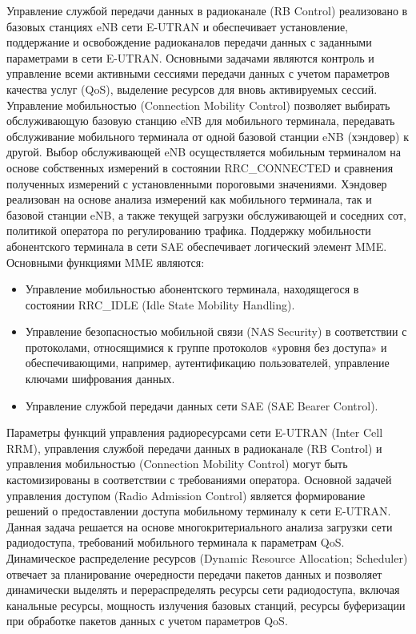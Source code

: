 Управление службой передачи данных в радиоканале (RB Control) реализовано в базовых станциях eNB сети E-UTRAN и обеспечивает установление, поддержание и освобождение радиоканалов передачи данных с заданными параметрами в сети E-UTRAN. Основными задачами являются контроль и управление всеми активными сессиями передачи данных с учетом параметров качества услуг (QoS), выделение ресурсов для вновь активируемых сессий.
Управление мобильностью (Connection Mobility Control) позволяет выбирать обслуживающую базовую станцию eNB для мобильного терминала, передавать обслуживание мобильного терминала от одной базовой станции eNB (хэндовер) к другой. Выбор обслуживающей eNB осуществляется мобильным терминалом на основе собственных измерений в состоянии RRC\_CONNECTED и сравнения полученных измерений с установленными пороговыми значениями. Хэндовер реализован на основе анализа измерений как мобильного терминала, так и базовой станции eNB, а также текущей загрузки обслуживающей и соседних сот, политикой оператора по регулированию трафика.
Поддержку мобильности абонентского терминала в сети SAE обеспечивает логический элемент MME. Основными функциями MME являются:
\begin{itemize}
  \item Управление мобильностью абонентского терминала, находящегося в состоянии RRC\_IDLE (Idle State Mobility Handling).
  \item Управление безопасностью мобильной связи (NAS Security) в соответствии с протоколами, относящимися к группе протоколов «уровня без доступа» и обеспечивающими, например, аутентификацию пользователей, управление ключами шифрования данных.
  \item Управление службой передачи данных сети SAE (SAE Bearer Control).
\end{itemize}
Параметры функций управления радиоресурсами сети E-UTRAN (Inter
Cell RRM), управления службой передачи данных в радиоканале (RB Control) и управления мобильностью (Connection Mobility Control) могут быть кастомизированы в соответствии с требованиями оператора.
Основной задачей управления доступом (Radio Admission Control) является формирование решений о предоставлении доступа мобильному терминалу к сети E-UTRAN. Данная задача решается на основе многокритериального анализа загрузки сети радиодоступа, требований мобильного терминала к параметрам QoS.
Динамическое распределение ресурсов (Dynamic Resource Allocation; Scheduler) отвечает за планирование очередности передачи пакетов данных и позволяет динамически выделять и перераспределять ресурсы сети радиодоступа, включая канальные ресурсы, мощность излучения базовых станций, ресурсы буферизации при обработке пакетов данных с учетом параметров QoS.
